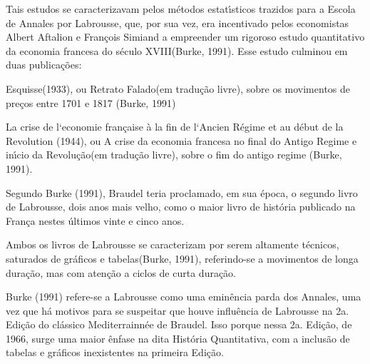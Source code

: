 \documentclass[
12pt,		%
openright,	%
twoside,  %
a4paper,			%
chapter=TITLE,		%
english,			%
french,				%
spanish,			%
brazil				%
]{USPSC-classe/USPSC}
\begin{document}
Tais estudos se caracterizavam pelos m\'etodos estat\'{\i}sticos trazidos para a Escola de Annales por Labrousse, que, por sua vez, era \textquotedbl incentivado pelos economistas Albert Aftalion e Fran\c{c}ois Simiand a empreender um rigoroso estudo quantitativo da economia francesa do s\'eculo XVIII\textquotedbl   (Burke, 1991). Esse estudo culminou em duas publica\c{c}\~oes:









\begin{alineas}
\item \textquotedbl Esquisse\textquotedbl  (1933), ou \textquotedbl Retrato Falado\textquotedbl  (em tradu\c{c}\~ao livre), sobre os movimentos de pre\c{c}os entre 1701 e 1817  (Burke, 1991)
\item La crise de l`economie fran\c{c}aise \`a la fin de l`Ancien R\'egime et au d\'ebut de la Revolution (1944), ou \textquotedbl A crise da economia francesa no final do Antigo Regime e in\'{\i}cio da Revolu\c{c}\~ao\textquotedbl  (em tradu\c{c}\~ao livre), sobre o fim do antigo regime  (Burke, 1991).

\end{alineas}

Segundo  Burke (1991), Braudel teria proclamado, em sua \'epoca, o segundo livro de Labrousse, dois anos mais velho, como \textquotedbl o maior livro de hist\'oria publicado na Fran\c{c}a nestes \'ultimos vinte e cinco anos\textquotedbl .








Ambos os livros de Labrousse se caracterizam por serem altamente t\'ecnicos, \textquotedbl saturados de gr\'aficos e tabelas\textquotedbl   (Burke, 1991), referindo-se a movimentos de longa dura\c{c}\~ao, mas com aten\c{c}\~ao a ciclos de curta dura\c{c}\~ao.








Burke (1991) refere-se a Labrousse como uma \textquotedbl emin\^encia parda dos Annales\textquotedbl , uma vez que \textquotedbl h\'a motivos para se suspeitar que houve influ\^encia de Labrousse na 2a. Edi\c{c}\~ao do cl\'assico Mediterrainn\'ee de Braudel\textquotedbl . Isso porque nessa 2a. Edi\c{c}\~ao, de 1966, surge uma maior \^enfase na dita Hist\'oria Quantitativa, com a inclus\~ao de tabelas e gr\'aficos inexistentes na primeira Edi\c{c}\~ao.
\end{document}
